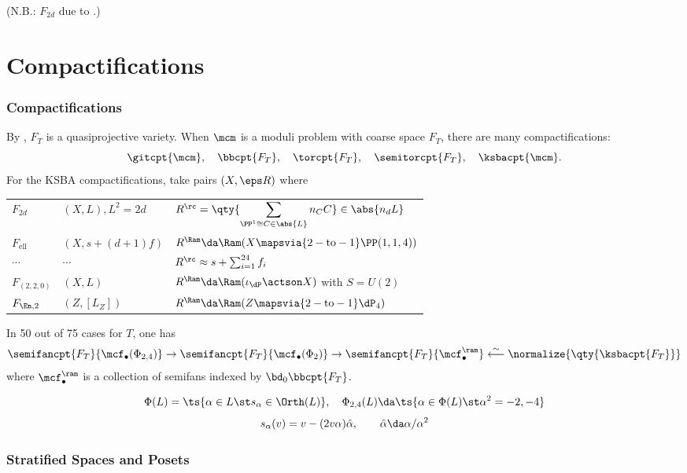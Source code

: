 \documentclass{beamer}
\begin{document}
{\begin{frame}
{\tiny
(N.B.: $F_{2d}$ due to \cite{Sca87, Laz16, AET23}.)
}

\end{frame}
\section{Compactifications}
\begin{frame}\frametitle{Compactifications}
By \cite{BB66}, $F_T$ is a quasiprojective variety.
When $\mcm$ is a moduli problem with coarse space $F_T$, there are many compactifications:
\[
\gitcpt{\mcm}, \quad
\bbcpt{F_T}, \quad 
\torcpt{F_T}, \quad
\semitorcpt{F_T}, \quad
\ksbacpt{\mcm}
.\]
For the KSBA compactifications, take pairs $(X, \eps R)$ where

{\small
\begin{tabular}{l|ll}
	$F_{2d}$ 
		& $(X, L), L^2=2d$
		& $R^{\rc} = \qty{ \displaystyle\sum_{\PP^1\cong C \in \abs{L}} n_C C}\in \abs{n_d L}$ 
		\\
	$F_{\mathrm{ell}}$ 
		& $(X, s + (d+1)f)$ 
		& $R^{\Ram} \da \Ram(X \mapsvia{2-\text{to}-1} \PP(1,1,4))$ 
		\\
	$\cdots$ 
		& $\cdots$ 
		& $R^{\rc} \approx s + \sum_{i=1}^{24} f_i$
		\\
	$F_{(2,2,0)}$ 
		& $(X, L)$ 
		& $R^{\Ram} \da \Ram(\iota_{\dP} \actson X)$ with $S = U(2)$
		\\
	$F_{\En, 2}$
		& $(Z, [L_Z])$ 
		& $R^{\Ram} \da \Ram(Z \mapsvia{2-\text{to}-1} \dP_4)$
		\\
\end{tabular}
}

\end{frame}
\begin{frame}
\begin{theorem}[{\cite[Thm. 9.10]{AE22}}]
In 50 out of 75 cases for $T$, one has
\[
\semifancpt{F_T}{\mcf_\bullet(\Phi_{2, 4})} \to
\semifancpt{F_T}{\mcf_\bullet(\Phi_2)} \to
\semifancpt{F_T}{\mcf_\bullet^{\ram}}
\overset{\sim}{\longleftarrow}
\normalize{\qty{ \ksbacpt{F_T}}} 
\]
where $\mcf_\bullet^{\ram}$ is a collection of semifans indexed by $\bd_0 \bbcpt{F_T}$.
\end{theorem}
\vspace{2em}
{\small
\begin{align*}
\Phi(L) = \ts{\alpha \in L \st s_\alpha \in \Orth(L)}, 
\quad
\Phi_{2, 4}(L) \da \ts{\alpha \in \Phi(L) \st \alpha^2 = -2, -4}
\end{align*}
\[
s_\alpha(v) = v - (2v\alpha) \hat{\alpha}, \qquad \hat{\alpha} \da \alpha/\alpha^2
\]
}
\end{frame}
\begin{frame}\frametitle{Stratified Spaces and Posets}
\end{frame}

}
\end{document}
